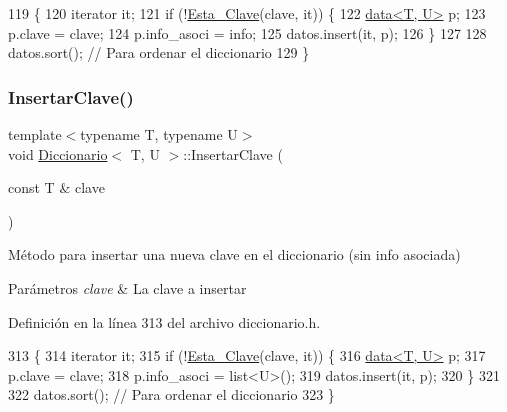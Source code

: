 \begin{DoxyCode}
119                                                        \{
120         iterator it;
121         \textcolor{keywordflow}{if} (!\hyperlink{classDiccionario_a16314351b0600835ade3c7add2ffe040}{Esta\_Clave}(clave, it)) \{
122             \hyperlink{structdata}{data<T, U>} p;
123             p.clave = clave;
124             p.info\_asoci = info;
125             datos.insert(it, p);
126         \}
127 
128         datos.sort();                                                           \textcolor{comment}{// Para ordenar el
       diccionario}
129     \}
\end{DoxyCode}
\mbox{\label{classDiccionario_ae5fdb31e4d61fa67cbfbccdc9d46e6ca}} 
\subsubsection{\texorpdfstring{Insertar\+Clave()}{InsertarClave()}}
{\footnotesize\ttfamily template$<$typename T, typename U$>$ \\
void \hyperlink{classDiccionario}{Diccionario}$<$ T, U $>$\+::Insertar\+Clave (\begin{DoxyParamCaption}\item[{const T \&}]{clave }\end{DoxyParamCaption})\hspace{0.3cm}{\ttfamily [inline]}}



Método para insertar una nueva clave en el diccionario (sin info asociada) 


\begin{DoxyParams}{Parámetros}
{\em clave} & La clave a insertar \\
\hline
\end{DoxyParams}


Definición en la línea 313 del archivo diccionario.\+h.


\begin{DoxyCode}
313                                        \{
314         iterator it;
315         \textcolor{keywordflow}{if} (!\hyperlink{classDiccionario_a16314351b0600835ade3c7add2ffe040}{Esta\_Clave}(clave, it)) \{
316             \hyperlink{structdata}{data<T, U>} p;
317             p.clave = clave;
318             p.info\_asoci = list<U>();
319             datos.insert(it, p);
320         \}
321 
322         datos.sort();                                                           \textcolor{comment}{// Para ordenar el
       diccionario}
323     \}
\end{DoxyCode}
\mbox{\label{classDiccionario_a774c3decde31fff339371374f74ca9d8}} 
